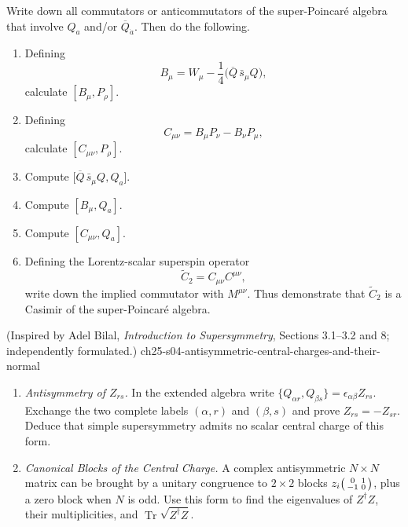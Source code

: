 \begin{enumerate}
  Write down all commutators or anticommutators of the super-Poincar\'e
  algebra that involve \(Q_a\) and/or \(\overline Q_{\dot a}\).  Then do
  the following.
  \begin{enumerate}
    \item Defining
      \[
        B_\mu=W_\mu-\frac14
          \bigl(\overline Q\,\bar s_\mu Q\bigr),
      \]
      calculate \([B_\mu,P_\rho]\).
    \item Defining
      \[
        C_{\mu\nu}=B_\mu P_\nu-B_\nu P_\mu,
      \]
      calculate \([C_{\mu\nu},P_\rho]\).
    \item Compute
      \(\bigl[\overline Q\,\bar s_\mu Q,Q_a\bigr]\).
    \item Compute \([B_\mu,Q_a]\).
    \item Compute \([C_{\mu\nu},Q_a]\).
    \item Defining the Lorentz-scalar superspin operator
      \[
        \widetilde C_2=C_{\mu\nu}C^{\mu\nu},
      \]
      write down the implied commutator with \(M^{\mu\nu}\).  Thus
      demonstrate that \(\widetilde C_2\) is a Casimir of the
      super-Poincar\'e algebra.
  \end{enumerate}

    {(Inspired by Adel Bilal, \emph{Introduction to Supersymmetry}, Sections 3.1--3.2 and 8; independently formulated.)}
    {ch25-s04-antisymmetric-central-charges-and-their-normal}
  \begin{enumerate}
    \item \emph{Antisymmetry of \(Z_{rs}\).}
    In the extended algebra write
      \(\{Q_{\alpha r},Q_{\beta s}\}
      =\epsilon_{\alpha\beta}Z_{rs}\).
      Exchange the two complete labels \((\alpha,r)\) and \((\beta,s)\) and
      prove \(Z_{rs}=-Z_{sr}\).  Deduce that simple supersymmetry admits no
      scalar central charge of this form.
    \item \emph{Canonical Blocks of the Central Charge.}
    A complex antisymmetric \(N\times N\) matrix can be brought by a unitary
      congruence to \(2\times2\) blocks
      \(z_i\begin{psmallmatrix}0&1\\-1&0\end{psmallmatrix}\), plus a zero block
      when \(N\) is odd.  Use this form to find the eigenvalues of
      \(Z^\dagger Z\), their multiplicities, and
      \(\operatorname{Tr}\sqrt{Z^\dagger Z}\).
  \end{enumerate}


\end{enumerate}

